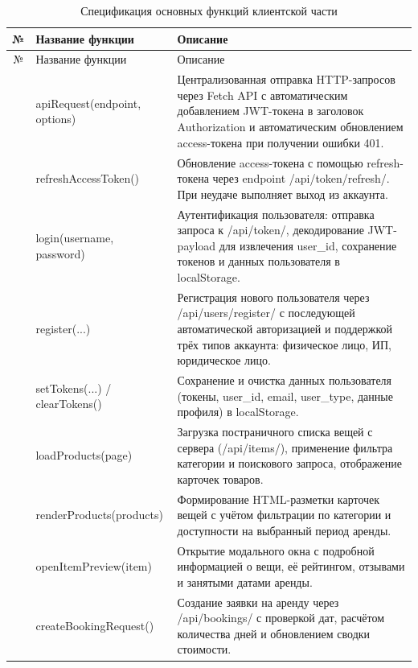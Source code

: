 \begin{xltabular}{\textwidth}{|c|X|X|}
	\caption{Спецификация основных функций клиентской части \label{tab:spec_functions}}\\ \hline
	\centrow № & \centrow Название функции & \centrow Описание \\ \hline
	\endfirsthead
	\centrow № & \centrow Название функции & \centrow Описание \\ \hline
	\finishhead
	 & \leftrow apiRequest(endpoint, options) & \leftrow Централизованная отправка HTTP-запросов через Fetch API с автоматическим добавлением JWT-токена в заголовок Authorization и автоматическим обновлением access-токена при получении ошибки 401. \\ \hline
	 & \leftrow refreshAccessToken() & \leftrow Обновление access-токена с помощью refresh-токена через endpoint /api/token/refresh/. При неудаче выполняет выход из аккаунта. \\ \hline
	 & \leftrow login(username, password) & \leftrow Аутентификация пользователя: отправка запроса к /api/token/, декодирование JWT-payload для извлечения user\_id, сохранение токенов и данных пользователя в localStorage. \\ \hline
	 & \leftrow register(...) & \leftrow Регистрация нового пользователя через /api/users/register/ с последующей автоматической авторизацией и поддержкой трёх типов аккаунта: физическое лицо, ИП, юридическое лицо. \\ \hline
	 & \leftrow setTokens(...) / clearTokens() & \leftrow Сохранение и очистка данных пользователя (токены, user\_id, email, user\_type, данные профиля) в localStorage. \\ \hline
	 & \leftrow loadProducts(page) & \leftrow Загрузка постраничного списка вещей с сервера (/api/items/), применение фильтра категории и поискового запроса, отображение карточек товаров. \\ \hline
	 & \leftrow renderProducts(products) & \leftrow Формирование HTML-разметки карточек вещей с учётом фильтрации по категории и доступности на выбранный период аренды. \\ \hline
	 & \leftrow openItemPreview(item) & \leftrow Открытие модального окна с подробной информацией о вещи, её рейтингом, отзывами и занятыми датами аренды. \\ \hline
	 & \leftrow createBookingRequest() & \leftrow Создание заявки на аренду через /api/bookings/ с проверкой дат, расчётом количества дней и обновлением сводки стоимости. \\ \hline

\end{xltabular}
